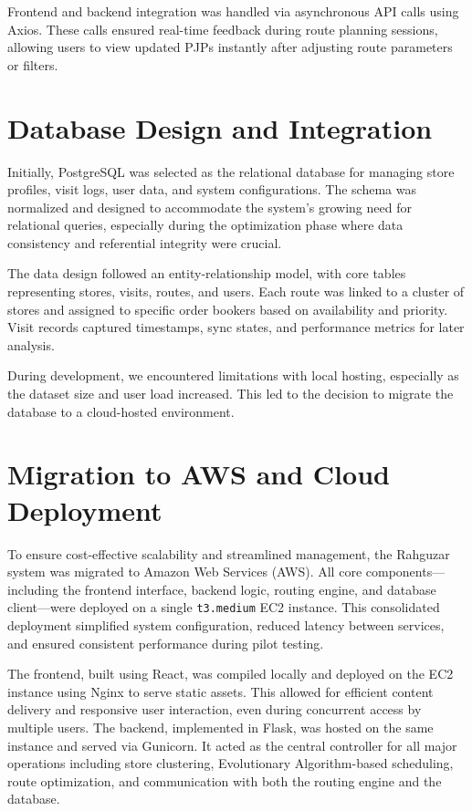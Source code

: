 Frontend and backend integration was handled via asynchronous API calls using Axios. These calls ensured real-time feedback during route planning sessions, allowing users to view updated PJPs instantly after adjusting route parameters or filters.

\section{Database Design and Integration}
Initially, PostgreSQL was selected as the relational database for managing store profiles, visit logs, user data, and system configurations. The schema was normalized and designed to accommodate the system's growing need for relational queries, especially during the optimization phase where data consistency and referential integrity were crucial.

The data design followed an entity-relationship model, with core tables representing stores, visits, routes, and users. Each route was linked to a cluster of stores and assigned to specific order bookers based on availability and priority. Visit records captured timestamps, sync states, and performance metrics for later analysis.

During development, we encountered limitations with local hosting, especially as the dataset size and user load increased. This led to the decision to migrate the database to a cloud-hosted environment.

\section{Migration to AWS and Cloud Deployment}

To ensure cost-effective scalability and streamlined management, the Rahguzar system was migrated to Amazon Web Services (AWS). All core components—including the frontend interface, backend logic, routing engine, and database client—were deployed on a single \texttt{t3.medium} EC2 instance. This consolidated deployment simplified system configuration, reduced latency between services, and ensured consistent performance during pilot testing.

The frontend, built using React, was compiled locally and deployed on the EC2 instance using Nginx to serve static assets. This allowed for efficient content delivery and responsive user interaction, even during concurrent access by multiple users. The backend, implemented in Flask, was hosted on the same instance and served via Gunicorn. It acted as the central controller for all major operations including store clustering, Evolutionary Algorithm-based scheduling, route optimization, and communication with both the routing engine and the database.

